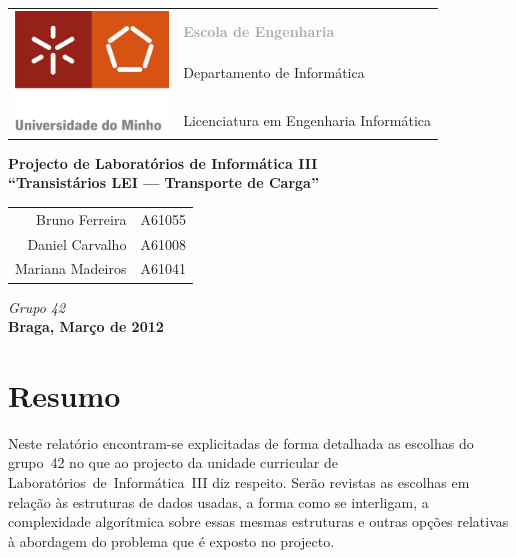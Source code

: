 \documentclass[a5paper,twocolumn, 11pt]{article}
\begin{document}
\onecolumn
\thispagestyle{empty}
\begin{tabular}{ll}
    \multirow{7}{*}{ \includegraphics[height=90pt]{logo.jpeg} }
    &\\
    & \textcolor{DarkGray}{\Large{\textbf{Escola de Engenharia}}} \\
    &\\
    & \large{Departamento de Informática}\\
    &\\
    &\\
    & \large{Licenciatura em Engenharia Informática}\\
\end{tabular}
\begin{center}
    \Large{\textbf{Projecto de Laboratórios de Informática III}}\\
    \vspace{20pt}
    \Large{\textbf{``Transistários LEI --- Transporte de Carga''}}\\
    \vspace{15pt}
    \begin{tabular}{r@{, }l}
        Bruno Ferreira&A61055\\
        Daniel Carvalho&A61008\\
        Mariana Madeiros&A61041\\
    \end{tabular}
    
    \vspace{5pt}
    \emph{Grupo 42}\\\vspace{15pt}
    \large{\textbf{Braga, Março de 2012}}
\end{center}

\newpage
\twocolumn
\tableofcontents
\newpage
\listoffigures

\newpage
\section{Resumo}
Neste relatório encontram-se explicitadas de forma detalhada as escolhas do \mbox{grupo 42} no que ao projecto da unidade curricular de \mbox{Laboratórios de Informática III} diz respeito. Serão revistas as escolhas em relação às estruturas de dados usadas, a forma como se interligam, a complexidade algorítmica sobre essas mesmas estruturas e outras opções relativas à abordagem do problema que é exposto no projecto.
\end{document}
